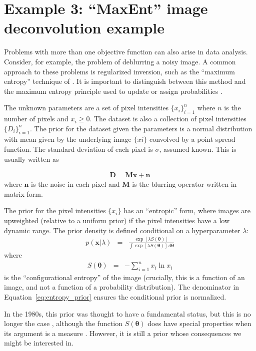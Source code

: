 \documentclass[entropy,article,submit,moreauthors,pdftex,10pt,a4paper]{Definitions/mdpi}
\newcommand{\xx}{\boldsymbol{\theta}}
\begin{document}
\section{Example 3: ``MaxEnt'' image deconvolution example}

Problems with more than one objective function can also arise in data
analysis. Consider, for example, the problem of deblurring a noisy
image. A common approach to these problems is regularized inversion,
such as the ``maximum entropy'' technique of \citet{gull}. It is important
to distinguish between this method and the maximum entropy principle used
to update or assign probabilities \citep{caticha}.

The unknown parameters are a set of pixel intensities
$\{x_i\}_{i=1}^n$ where $n$ is the number of pixels and $x_i \geq 0$.
The dataset is also a collection of pixel intensities $\{D_i\}_{i=1}^n$.
The prior for the dataset given the parameters is a normal distribution
with mean given by the underlying image $\{xi\}$ convolved by
a point spread function. The standard deviation of each pixel is
$\sigma$, assumed known. This is usually written as

\begin{eqnarray}
\boldsymbol{D} = \boldsymbol{M}\boldsymbol{x} + \boldsymbol{n}
\end{eqnarray}
where $\boldsymbol{n}$ is the noise in each pixel and $\boldsymbol{M}$ is
the blurring operator written in matrix form.

The prior for the pixel intensities $\{x_i\}$ has an ``entropic'' form,
where images are upweighted (relative to a uniform prior) if the pixel
intensities have a low dynamic range. The prior density is defined conditional
on a hyperparameter $\lambda$:
\begin{eqnarray}
p(\boldsymbol{x} | \lambda) &=&
\frac{\exp\left[\lambda S(\xx)\right]}{\int \exp\left[\lambda S(\xx)\right] \, d\xx}
\label{eq:entropy_prior}
\end{eqnarray}
where
\begin{eqnarray}
S(\xx) &=& -\sum_{i=1}^n x_i \ln x_i
\end{eqnarray}
is the ``configurational entropy'' of the image (crucially, this is a function of
an image, and not a function of a probability distribution).
The denominator in Equation~\ref{eq:entropy_prior} ensures the conditional prior
is normalized.

In the 1980s, this prior was thought to have a fundamental status, but this
is no longer the case \citep{massinf}, although the function $S(\xx)$ does
have special properties when its argument is a measure \citep{knuth_skilling}.
However, it is still a prior whose
consequences we might be interested in.
\end{document}
